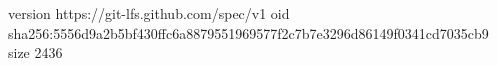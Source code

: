 version https://git-lfs.github.com/spec/v1
oid sha256:5556d9a2b5bf430ffc6a8879551969577f2c7b7e3296d86149f0341cd7035cb9
size 2436
